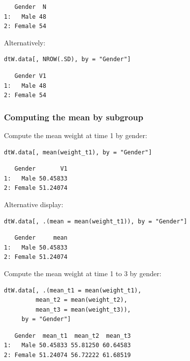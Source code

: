 \documentclass{article}
\begin{document}
\begin{verbatim}
   Gender  N
1:   Male 48
2: Female 54
\end{verbatim}

Alternatively:
\lstset{language=r,label= ,caption= ,captionpos=b,numbers=none}
\begin{lstlisting}
dtW.data[, NROW(.SD), by = "Gender"]
\end{lstlisting}

\begin{verbatim}
   Gender V1
1:   Male 48
2: Female 54
\end{verbatim}

\subsubsection{Computing the mean by subgroup}
\label{sec:orgd6e85d7}

Compute the mean weight at time 1 by gender:
\lstset{language=r,label= ,caption= ,captionpos=b,numbers=none}
\begin{lstlisting}
dtW.data[, mean(weight_t1), by = "Gender"]
\end{lstlisting}

\begin{verbatim}
   Gender       V1
1:   Male 50.45833
2: Female 51.24074
\end{verbatim}

Alternative display:
\lstset{language=r,label= ,caption= ,captionpos=b,numbers=none}
\begin{lstlisting}
dtW.data[, .(mean = mean(weight_t1)), by = "Gender"]
\end{lstlisting}

\begin{verbatim}
   Gender     mean
1:   Male 50.45833
2: Female 51.24074
\end{verbatim}

Compute the mean weight at time 1 to 3 by gender:
\lstset{language=r,label= ,caption= ,captionpos=b,numbers=none}
\begin{lstlisting}
dtW.data[, .(mean_t1 = mean(weight_t1),
	     mean_t2 = mean(weight_t2),
	     mean_t3 = mean(weight_t3)), 
	 by = "Gender"]
\end{lstlisting}

\begin{verbatim}
   Gender  mean_t1  mean_t2  mean_t3
1:   Male 50.45833 55.81250 60.64583
2: Female 51.24074 56.72222 61.68519
\end{verbatim}
\end{document}
